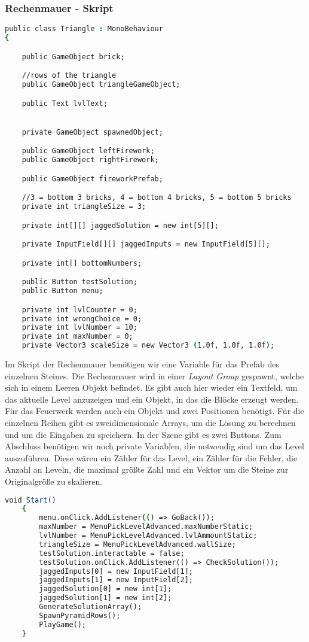 \subsubsection{Rechenmauer - Skript}
\begin{lstlisting}[language=csh, caption={Triangle.cs Variablen-Deklaration}]
public class Triangle : MonoBehaviour
{

	public GameObject brick;

	//rows of the triangle
	public GameObject triangleGameObject;

	public Text lvlText;


	private GameObject spawnedObject;

	public GameObject leftFirework;
	public GameObject rightFirework;

	public GameObject fireworkPrefab;

	//3 = bottom 3 bricks, 4 = bottom 4 bricks, 5 = bottom 5 bricks
	private int triangleSize = 3;

	private int[][] jaggedSolution = new int[5][];

	private InputField[][] jaggedInputs = new InputField[5][];

	private int[] bottomNumbers;

	public Button testSolution;
	public Button menu;

	private int lvlCounter = 0;
	private int wrongChoice = 0;
	private int lvlNumber = 10;
	private int maxNumber = 0;
	private Vector3 scaleSize = new Vector3 (1.0f, 1.0f, 1.0f);
\end{lstlisting}
Im Skript der Rechenmauer benötigen wir eine Variable für das Prefab des einzelnen Steines. Die Rechenmauer wird in einer \textit{Layout Group} gespawnt, welche sich in einem Leeren Objekt befindet. Es gibt auch hier wieder ein Textfeld, um das aktuelle Level anzuzeigen und ein Objekt, in das die Blöcke erzeugt werden. Für das Feuerwerk werden auch ein Objekt und zwei Positionen benötigt. Für die einzelnen Reihen gibt es zweidimensionale Arrays, um die Lösung zu berechnen und um die Eingaben zu speichern. In der Szene gibt es zwei Buttons. Zum Abschluss benötigen wir noch private Variablen, die notwendig sind um das Level auszuführen. Diese wären ein Zähler für das Level, ein Zähler für die Fehler, die Anzahl an Leveln, die maximal größte Zahl und ein Vektor um die Steine zur Originalgröße zu skalieren.\\
\begin{lstlisting}[language=csh, caption={Triangle.cs Start-Funktion}]
	void Start()
	{
		menu.onClick.AddListener(() => GoBack());
		maxNumber = MenuPickLevelAdvanced.maxNumberStatic;
		lvlNumber = MenuPickLevelAdvanced.lvlAmmountStatic;
		triangleSize = MenuPickLevelAdvanced.wallSize;
		testSolution.interactable = false;
		testSolution.onClick.AddListener(() => CheckSolution());
		jaggedInputs[0] = new InputField[1];
		jaggedInputs[1] = new InputField[2];
		jaggedSolution[0] = new int[1];
		jaggedSolution[1] = new int[2];
		GenerateSolutionArray();
		SpawnPyramidRows();
		PlayGame();
	}
\end{lstlisting}
